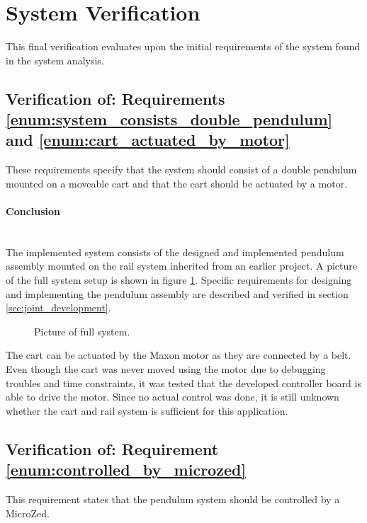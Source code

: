 \section{System Verification}
\label{sec:system_verification}
This final verification evaluates upon the initial requirements of the system found in the system analysis.

\subsection{Verification of: Requirements \ref{enum:system_consists_double_pendulum} and \ref{enum:cart_actuated_by_motor}} %
\label{sub:verification_of_requirement_enum:system_consists_double_pendulum}
These requirements specify that the system should consist of a double pendulum mounted on a moveable cart and that the cart should be actuated by a motor.

\paragraph{Conclusion}~\\
The implemented system consists of the designed and implemented pendulum assembly mounted on the rail system inherited from an earlier project.
A picture of the full system setup is shown in figure \ref{fig:pic_full_system}.
Specific requirements for designing and implementing the pendulum assembly are described and verified in section \ref{sec:joint_development}.
\begin{figure}
	\centering
	\caption{Picture of full system.}
	\label{fig:pic_full_system}
\end{figure}
The cart can be actuated by the Maxon motor as they are connected by a belt. 
Even though the cart was never moved using the motor due to debugging troubles and time constraints, it was tested that the developed controller board is able to drive the motor.
Since no actual control was done, it is still unknown whether the cart and rail system is sufficient for this application.

\subsection{Verification of: Requirement \ref{enum:controlled_by_microzed}} %
\label{sub:verification_of_requirement_enum:controlled_by_microzed}
This requirement states that the pendulum system should be controlled by a MicroZed.

